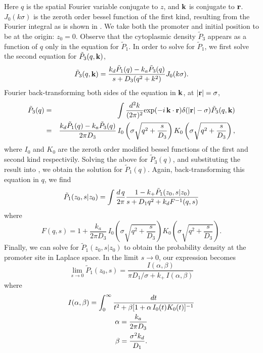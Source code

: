 Here $q$ is the spatial Fourier variable conjugate to $z$, and ${\bf k}$ is conjugate to ${\bf r}$. $J_0(k\sigma)$ is the zeroth order bessel function of the first kind, resulting from the Fourier integral as is shown in . We take both the promoter and initial position to be at the origin: $z_0 = 0$. Observe that the cytoplasmic density $\tilde{P}_3$ appears as a function of $q$ only in the equation for $\tilde{P}_1$. In order to solve for $\tilde{P}_1$, we first solve the second equation for $\tilde{P}_3(q,{\bf k})$, 
\begin{equation}
 \tilde{P}_3(q,{\bf k}) = \frac{k_d \tilde{P}_1(q) - k_a\tilde{P}_3(q)}{s + D_3(q^2 + k^2)} J_{0}(k \sigma ).
\end{equation}
Fourier back-transforming both sides of the equation in ${\bf k}$, at $|{\bf r}|=\sigma$,
\begin{eqnarray}
 \elabel{FourierBackC}
 \tilde{P}_3(q) & = & \int \frac{d^2 k}{(2 \pi)^2} {\rm exp}(-i\,{\bf k}\cdot{\bf r}) \delta(|{\bf r}|-\sigma) \tilde{P}_3(q,{\bf k}) \\
 & = & \frac{k_d \tilde{P}_1(q) - k_a\tilde{P}_3(q)}{2 \pi D_3} \, I_{0}\left( \sigma \sqrt{q^2 + \frac{s}{D_3}} \right) K_{0}\left( \sigma \sqrt{q^2 + \frac{s}{D_3}} \right),
\end{eqnarray}
where $I_0$ and $K_0$ are the zeroth order modified bessel functions of the first and second kind respectivily. Solving the above for $\tilde{P}_3(q)$, and substituting the result into , we obtain the solution for $\tilde{P}_1(q)$. Again, back-transforming this equation in $q$, we find
\begin{equation}
 \tilde{P}_1(z_0,s|z_0) = \int \frac{d\,q}{2 \pi} \frac{1-k_+ \tilde{P}_1(z_0,s|z_0)}{s + D_1 q^2+k_d F^{-1}(q,s)}
 \elabel{FDE_dna2}
\end{equation}
where
\begin{equation}
F(q,s) = 1 + \frac{k_a}{2 \pi D_3} \, I_{0}\left( \sigma \sqrt{q^2 + \frac{s}{D_3}} \right) K_{0}\left( \sigma \sqrt{q^2 + \frac{s}{D_3}} \right).
\end{equation}
Finally, we can solve  for $\tilde{P}_1(z_0, s|z_0)$ to obtain the probability density at the promoter site in Laplace space. In the limit $s \to 0$, our expression becomes
\begin{equation}
 \lim_{s \to 0} \tilde{P}_1(z_0, s) = \frac{I(\alpha,\beta)}{\pi D_1 / \sigma + k_+ \, I(\alpha,\beta)}
\end{equation}
where
\begin{gather}
 I(\alpha,\beta) = \int_0^{\infty} \frac{dt}{t^2 + \beta[1 + \alpha \, I_0(t) K_0(t)]^{-1}} \\
 \alpha = \frac{k_a}{2 \pi D_3} \elabel{EqAlpha} \\
 \beta = \frac{\sigma^2 k_d}{D_1} \elabel{EqBeta}.
\end{gather}
